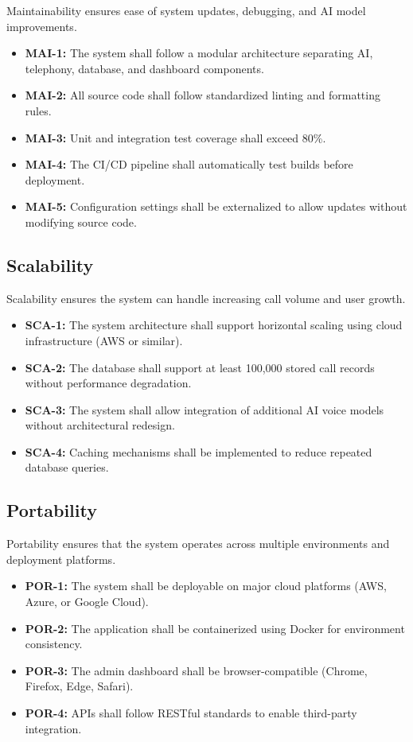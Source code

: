 \documentclass[12pt,a4paper]{report}
\begin{document}
Maintainability ensures ease of system updates, debugging, and AI model improvements.

\begin{itemize}
\item \textbf{MAI-1:} The system shall follow a modular architecture separating AI, telephony, database, and dashboard components.
\item \textbf{MAI-2:} All source code shall follow standardized linting and formatting rules.
\item \textbf{MAI-3:} Unit and integration test coverage shall exceed 80\%.
\item \textbf{MAI-4:} The CI/CD pipeline shall automatically test builds before deployment.
\item \textbf{MAI-5:} Configuration settings shall be externalized to allow updates without modifying source code.
\end{itemize}
\subsection{Scalability}

Scalability ensures the system can handle increasing call volume and user growth.

\begin{itemize}
\item \textbf{SCA-1:} The system architecture shall support horizontal scaling using cloud infrastructure (AWS or similar).
\item \textbf{SCA-2:} The database shall support at least 100,000 stored call records without performance degradation.
\item \textbf{SCA-3:} The system shall allow integration of additional AI voice models without architectural redesign.
\item \textbf{SCA-4:} Caching mechanisms shall be implemented to reduce repeated database queries.
\end{itemize}
\subsection{Portability}

Portability ensures that the system operates across multiple environments and deployment platforms.

\begin{itemize}
\item \textbf{POR-1:} The system shall be deployable on major cloud platforms (AWS, Azure, or Google Cloud).
\item \textbf{POR-2:} The application shall be containerized using Docker for environment consistency.
\item \textbf{POR-3:} The admin dashboard shall be browser-compatible (Chrome, Firefox, Edge, Safari).
\item \textbf{POR-4:} APIs shall follow RESTful standards to enable third-party integration.
\end{itemize}
\end{document}
